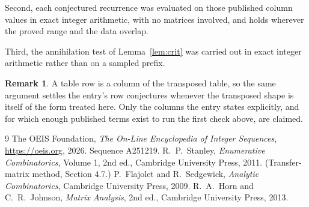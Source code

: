\documentclass[11pt,a4paper]{article}
\theoremstyle{plain}
\theoremstyle{definition}
\newtheorem{remark}[theorem]{Remark}
\begin{document}
Second, each conjectured recurrence was evaluated on those published column values in exact
integer arithmetic, with no matrices involved, and holds wherever the proved range and the
data overlap.

Third, the annihilation test of Lemma~\ref{lem:crit} was carried out in exact integer
arithmetic rather than on a sampled prefix.

\begin{remark}
A table row is a column of the transposed table, so the same argument settles the entry's row
conjectures whenever the transposed shape is itself of the form treated here. Only the columns
the entry states explicitly, and for which enough published terms exist to run the first check
above, are claimed.
\end{remark}

\begin{thebibliography}{9}
 The OEIS Foundation, \emph{The On-Line Encyclopedia of Integer
Sequences}, \url{https://oeis.org}, 2026. Sequence A251219.
 R.~P.~Stanley, \emph{Enumerative Combinatorics}, Volume 1, 2nd ed.,
Cambridge University Press, 2011. (Transfer-matrix method, Section 4.7.)
 P.~Flajolet and R.~Sedgewick, \emph{Analytic Combinatorics}, Cambridge
University Press, 2009.
 R.~A.~Horn and C.~R.~Johnson, \emph{Matrix Analysis}, 2nd ed., Cambridge
University Press, 2013.
\end{thebibliography}
\end{document}

